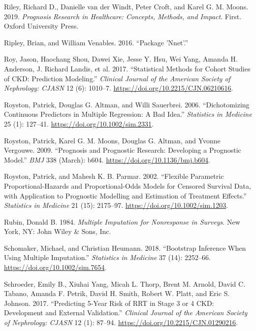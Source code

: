 \documentclass[
]{article}
\newlength{\cslhangindent}
\newenvironment{cslreferences}%
  {\setlength{\parindent}{0pt}%
  \everypar{\setlength{\hangindent}{\cslhangindent}}\ignorespaces}%
  {\par}
\begin{document}
\begin{cslreferences}
\leavevmode\hypertarget{ref-riley_prognosis_2019}{}%
Riley, Richard D., Danielle van der Windt, Peter Croft, and Karel G. M. Moons. 2019. \emph{Prognosis Research in Healthcare: Concepts, Methods, and Impact}. First. Oxford University Press.

\leavevmode\hypertarget{ref-ripley_package_2016}{}%
Ripley, Brian, and William Venables. 2016. ``Package 'Nnet'.''

\leavevmode\hypertarget{ref-roy_statistical_2017}{}%
Roy, Jason, Haochang Shou, Dawei Xie, Jesse Y. Hsu, Wei Yang, Amanda H. Anderson, J. Richard Landis, et al. 2017. ``Statistical Methods for Cohort Studies of CKD: Prediction Modeling.'' \emph{Clinical Journal of the American Society of Nephrology: CJASN} 12 (6): 1010--7. \url{https://doi.org/10.2215/CJN.06210616}.

\leavevmode\hypertarget{ref-royston_dichotomizing_2006}{}%
Royston, Patrick, Douglas G. Altman, and Willi Sauerbrei. 2006. ``Dichotomizing Continuous Predictors in Multiple Regression: A Bad Idea.'' \emph{Statistics in Medicine} 25 (1): 127--41. \url{https://doi.org/10.1002/sim.2331}.

\leavevmode\hypertarget{ref-royston_prognosis_2009}{}%
Royston, Patrick, Karel G. M. Moons, Douglas G. Altman, and Yvonne Vergouwe. 2009. ``Prognosis and Prognostic Research: Developing a Prognostic Model.'' \emph{BMJ} 338 (March): b604. \url{https://doi.org/10.1136/bmj.b604}.

\leavevmode\hypertarget{ref-royston_flexible_2002}{}%
Royston, Patrick, and Mahesh K. B. Parmar. 2002. ``Flexible Parametric Proportional-Hazards and Proportional-Odds Models for Censored Survival Data, with Application to Prognostic Modelling and Estimation of Treatment Effects.'' \emph{Statistics in Medicine} 21 (15): 2175--97. \url{https://doi.org/10.1002/sim.1203}.

\leavevmode\hypertarget{ref-rubin_multiple_1984}{}%
Rubin, Donald B. 1984. \emph{Multiple Imputation for Nonresponse in Surveys}. New York, NY: John Wiley \& Sons, Inc.

\leavevmode\hypertarget{ref-schomaker_bootstrap_2018}{}%
Schomaker, Michael, and Christian Heumann. 2018. ``Bootstrap Inference When Using Multiple Imputation.'' \emph{Statistics in Medicine} 37 (14): 2252--66. \url{https://doi.org/10.1002/sim.7654}.

\leavevmode\hypertarget{ref-schroeder_predicting_2017}{}%
Schroeder, Emily B., Xiuhai Yang, Micah L. Thorp, Brent M. Arnold, David C. Tabano, Amanda F. Petrik, David H. Smith, Robert W. Platt, and Eric S. Johnson. 2017. ``Predicting 5-Year Risk of RRT in Stage 3 or 4 CKD: Development and External Validation.'' \emph{Clinical Journal of the American Society of Nephrology: CJASN} 12 (1): 87--94. \url{https://doi.org/10.2215/CJN.01290216}.


\end{cslreferences}
\end{document}
